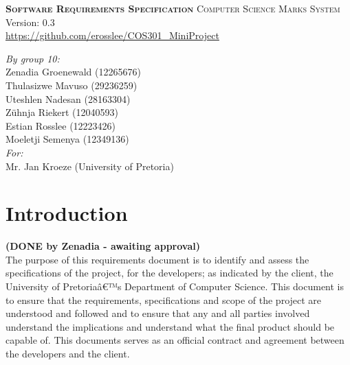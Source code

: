 \documentclass[11pt,a4paper]{article}
\begin{document}
\begin{titlepage}
\begin{center}

\textsc{\LARGE \bf{Software Requirements Specification}}
\textsc{\LARGE Computer Science Marks System}\\

\small Version: 0.3\\ \url{https://github.com/erosslee/COS301_MiniProject}

\vspace{0.5cm}
\textit{By group 10:}\\
Zenadia Groenewald (12265676)\\
Thulasizwe Mavuso (29236259)\\
Uteshlen Nadesan (28163304)\\
Z\"uhnja Riekert (12040593)\\
Estian Rosslee (12223426)\\
Moeletji Semenya (12349136)\\

\vspace{0.5cm}
\textit{For:} \\
Mr. Jan Kroeze (University of Pretoria)

\end{center}
\end{titlepage}
\newpage

\thispagestyle{empty}
\tableofcontents
\newpage

\setcounter{page}{1}
\pagestyle{plain}
\section{Introduction}
\textbf{(DONE by Zenadia - awaiting approval)}\\
The purpose of this requirements document is to identify and assess the specifications of the project, for the developers; as indicated by the client, the University of Pretoriaâ€™s Department of Computer Science. 
This document is to ensure that the requirements, specifications and scope of the project are understood and followed and to ensure that any and all parties involved understand the implications and understand what the final product should be capable of. This documents serves as an official contract and agreement between the developers and the client.
\end{document}
